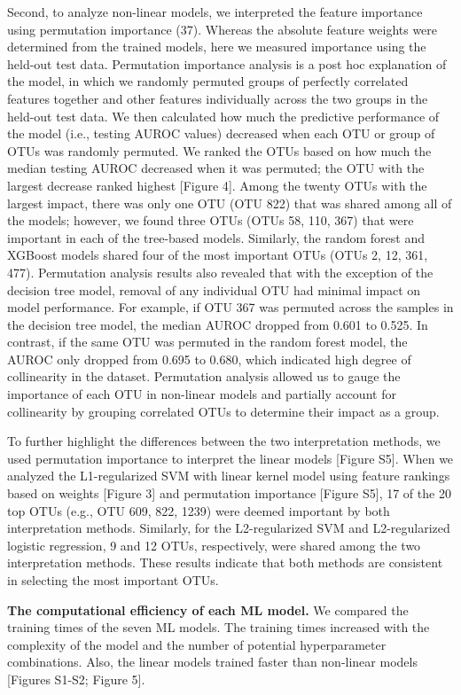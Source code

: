 \documentclass[11pt,]{article}
\begin{document}
Second, to analyze non-linear models, we interpreted the feature
importance using permutation importance (37). Whereas the absolute
feature weights were determined from the trained models, here we
measured importance using the held-out test data. Permutation importance
analysis is a post hoc explanation of the model, in which we randomly
permuted groups of perfectly correlated features together and other
features individually across the two groups in the held-out test data.
We then calculated how much the predictive performance of the model
(i.e., testing AUROC values) decreased when each OTU or group of OTUs
was randomly permuted. We ranked the OTUs based on how much the median
testing AUROC decreased when it was permuted; the OTU with the largest
decrease ranked highest {[}Figure 4{]}. Among the twenty OTUs with the
largest impact, there was only one OTU (OTU 822) that was shared among
all of the models; however, we found three OTUs (OTUs 58, 110, 367) that
were important in each of the tree-based models. Similarly, the random
forest and XGBoost models shared four of the most important OTUs (OTUs
2, 12, 361, 477). Permutation analysis results also revealed that with
the exception of the decision tree model, removal of any individual OTU
had minimal impact on model performance. For example, if OTU 367 was
permuted across the samples in the decision tree model, the median AUROC
dropped from 0.601 to 0.525. In contrast, if the same OTU was permuted
in the random forest model, the AUROC only dropped from 0.695 to 0.680,
which indicated high degree of collinearity in the dataset. Permutation
analysis allowed us to gauge the importance of each OTU in non-linear
models and partially account for collinearity by grouping correlated
OTUs to determine their impact as a group.

To further highlight the differences between the two interpretation
methods, we used permutation importance to interpret the linear models
{[}Figure S5{]}. When we analyzed the L1-regularized SVM with linear
kernel model using feature rankings based on weights {[}Figure 3{]} and
permutation importance {[}Figure S5{]}, 17 of the 20 top OTUs (e.g., OTU
609, 822, 1239) were deemed important by both interpretation methods.
Similarly, for the L2-regularized SVM and L2-regularized logistic
regression, 9 and 12 OTUs, respectively, were shared among the two
interpretation methods. These results indicate that both methods are
consistent in selecting the most important OTUs.

\textbf{The computational efficiency of each ML model.} We compared the
training times of the seven ML models. The training times increased with
the complexity of the model and the number of potential hyperparameter
combinations. Also, the linear models trained faster than non-linear
models {[}Figures S1-S2; Figure 5{]}.
\end{document}

